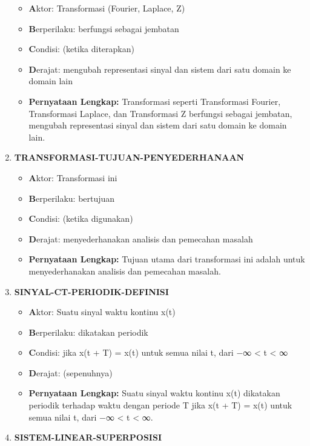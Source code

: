\documentclass[
  letterpaper,
  DIV=11,
  numbers=noendperiod]{scrreprt}
\begin{document}
\begin{enumerate}
  \begin{itemize}
  \item
    \textbf{A}ktor: Transformasi (Fourier, Laplace, Z)
  \item
    \textbf{B}erperilaku: berfungsi sebagai jembatan
  \item
    \textbf{C}ondisi: (ketika diterapkan)
  \item
    \textbf{D}erajat: mengubah representasi sinyal dan sistem dari satu
    domain ke domain lain
  \item
    \textbf{Pernyataan Lengkap:} Transformasi seperti Transformasi
    Fourier, Transformasi Laplace, dan Transformasi Z berfungsi sebagai
    jembatan, mengubah representasi sinyal dan sistem dari satu domain
    ke domain lain.
  \end{itemize}
\item
  \textbf{TRANSFORMASI-TUJUAN-PENYEDERHANAAN}

  \begin{itemize}
  \item
    \textbf{A}ktor: Transformasi ini
  \item
    \textbf{B}erperilaku: bertujuan
  \item
    \textbf{C}ondisi: (ketika digunakan)
  \item
    \textbf{D}erajat: menyederhanakan analisis dan pemecahan masalah
  \item
    \textbf{Pernyataan Lengkap:} Tujuan utama dari transformasi ini
    adalah untuk menyederhanakan analisis dan pemecahan masalah.
  \end{itemize}
\item
  \textbf{SINYAL-CT-PERIODIK-DEFINISI}

  \begin{itemize}
  \item
    \textbf{A}ktor: Suatu sinyal waktu kontinu x(t)
  \item
    \textbf{B}erperilaku: dikatakan periodik
  \item
    \textbf{C}ondisi: jika x(t + T) = x(t) untuk semua nilai t, dari −∞
    \textless{} t \textless{} ∞
  \item
    \textbf{D}erajat: (sepenuhnya)
  \item
    \textbf{Pernyataan Lengkap:} Suatu sinyal waktu kontinu x(t)
    dikatakan periodik terhadap waktu dengan periode T jika x(t + T) =
    x(t) untuk semua nilai t, dari −∞ \textless{} t \textless{} ∞.
  \end{itemize}
\item
  \textbf{SISTEM-LINEAR-SUPERPOSISI}


\end{enumerate}
\end{document}
